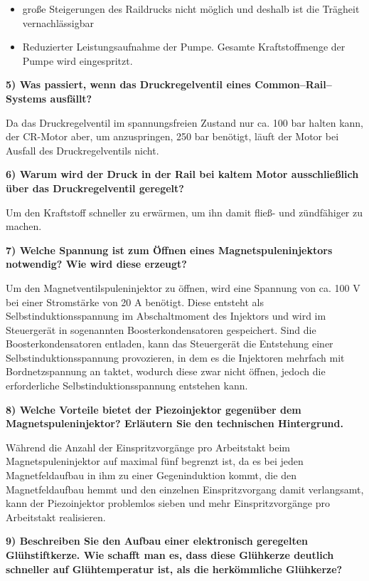 \begin{enumerate}
\begin{itemize}
    \begin{itemize}
    \item
      große Steigerungen des Raildrucks nicht möglich und deshalb ist
      die Trägheit vernachlässigbar
    \item
      Reduzierter Leistungsaufnahme der Pumpe. Gesamte Kraftstoffmenge
      der Pumpe wird eingespritzt.
    \end{itemize}
  \end{itemize}
\end{enumerate}

\textbf{5) Was passiert, wenn das Druckregelventil eines
Common--Rail--Systems ausfällt?}

Da das Druckregelventil im spannungsfreien Zustand nur ca. 100 bar
halten kann, der CR-Motor aber, um anzuspringen, 250 bar benötigt, läuft
der Motor bei Ausfall des Druckregelventils nicht.

\textbf{6) Warum wird der Druck in der Rail bei kaltem Motor
ausschließlich über das Druckregelventil geregelt?}

Um den Kraftstoff schneller zu erwärmen, um ihn damit fließ- und
zündfähiger zu machen.

\textbf{7) Welche Spannung ist zum Öffnen eines Magnetspuleninjektors
notwendig? Wie wird diese erzeugt?}

Um den Magnetventilspuleninjektor zu öffnen, wird eine Spannung von ca.
100 V bei einer Stromstärke von 20 A benötigt. Diese entsteht als
Selbstinduktionsspannung im Abschaltmoment des Injektors und wird im
Steuergerät in sogenannten Boosterkondensatoren gespeichert. Sind die
Boosterkondensatoren entladen, kann das Steuergerät die Entstehung einer
Selbstinduktionsspannung provozieren, in dem es die Injektoren mehrfach
mit Bordnetzspannung an taktet, wodurch diese zwar nicht öffnen, jedoch
die erforderliche Selbstinduktionsspannung entstehen kann.

\textbf{8) Welche Vorteile bietet der Piezoinjektor gegenüber dem
Magnetspuleninjektor? Erläutern Sie den technischen Hintergrund.}

Während die Anzahl der Einspritzvorgänge pro Arbeitstakt beim
Magnetspuleninjektor auf maximal fünf begrenzt ist, da es bei jeden
Magnetfeldaufbau in ihm zu einer Gegeninduktion kommt, die den
Magnetfeldaufbau hemmt und den einzelnen Einspritzvorgang damit
verlangsamt, kann der Piezoinjektor problemlos sieben und mehr
Einspritzvorgänge pro Arbeitstakt realisieren.

\textbf{9) Beschreiben Sie den Aufbau einer elektronisch geregelten
Glühstiftkerze. Wie schafft man es, dass diese Glühkerze deutlich
schneller auf Glühtemperatur ist, als die herkömmliche Glühkerze?}


